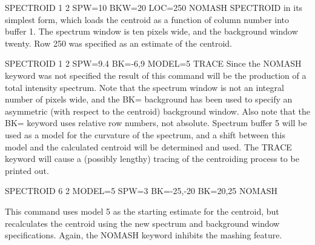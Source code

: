 {\newpage\clearpage
{}%
\begin{example}
  \item[SPECTROID 1 2 SPW=10 BKW=20 LOC=250 NOMASH\hfill]{ SPECTROID in its
       simplest form, which loads the centroid as a function of column
       number into buffer 1. The spectrum window is ten pixels wide, and
       the background window twenty. Row 250 was specified as an estimate
       of the centroid.}
\par\item[SPECTROID 1 2 SPW=9.4 BK=-6,9 MODEL=5 TRACE\hfill]{ Since the NOMASH
       keyword was not specified the result of this command will be the
       production of a total intensity spectrum.  Note that the spectrum
       window is not an integral number of pixels wide, and the BK=
       background has been used to specify an asymmetric (with respect to
       the centroid) background window.  Also note that the BK= keyword
       uses relative row numbers, not absolute.  Spectrum buffer 5 will be
       used as a model for the curvature of the spectrum, and a shift
       between this model and the calculated centroid will be determined
       and used.  The TRACE keyword will cause a (possibly lengthy) tracing
       of the centroiding process to be printed out.}
\par\item[SPECTROID 6 2 MODEL=5 SPW=3 BK=-25,-20 BK=20,25 NOMASH\hfill]
  \item{This command uses model 5 as the starting estimate for the
       centroid, but recalculates the centroid using the new spectrum and
       background window specifications.  Again, the NOMASH keyword
       inhibits the mashing feature.}
\end{example}%
\lthtmlfigureZ
\lthtmlcheckvsize\clearpage}

